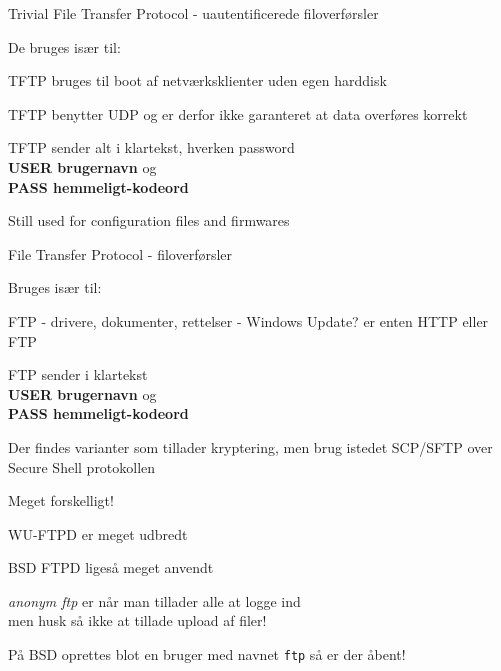 \documentclass[Screen16to9,17pt]{foils}
\begin{document}

\begin{list1}
\item Trivial File Transfer Protocol - uautentificerede filoverførsler
\item De bruges især til:
  \begin{list2}
\item TFTP bruges til boot af netværksklienter uden egen harddisk
\item TFTP benytter UDP og er derfor ikke garanteret at data overføres korrekt
  \end{list2}
\item TFTP sender alt i klartekst, hverken password \\
{\bfseries USER brugernavn} og \\
{\bfseries PASS hemmeligt-kodeord}
\end{list1}
Still used for configuration files and firmwares


\begin{list1}
\item File Transfer Protocol - filoverførsler
\item Bruges især til:
  \begin{list2}
    \item FTP - drivere, dokumenter, rettelser - Windows Update? er
    enten HTTP eller FTP
  \end{list2}
\item FTP sender i klartekst\\
{\bfseries USER brugernavn} og \\
{\bfseries PASS hemmeligt-kodeord}
\item Der findes varianter som tillader kryptering, men brug istedet SCP/SFTP over Secure Shell protokollen
\end{list1}



\begin{list1}
\item Meget forskelligt!
\item WU-FTPD er meget udbredt
\item BSD FTPD ligeså meget anvendt
\item \emph{anonym ftp} er når man tillader alle at logge ind\\
men husk så ikke at tillade upload af filer!
\item På BSD oprettes blot en bruger med navnet \verb+ftp+ så er der åbent!
\end{list1}
\end{document}
